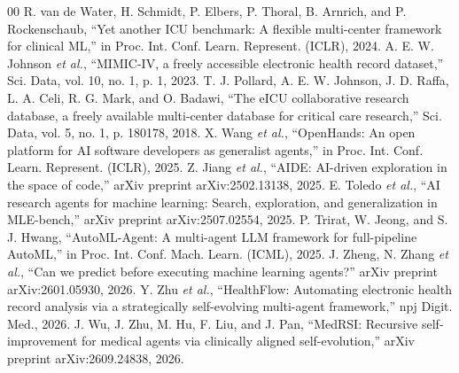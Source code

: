 \begin{thebibliography}{00}
 R. van de Water, H. Schmidt, P. Elbers, P. Thoral, B. Arnrich, and P. Rockenschaub, ``Yet another ICU benchmark: A flexible multi-center framework for clinical ML,'' in Proc. Int. Conf. Learn. Represent. (ICLR), 2024.
 A. E. W. Johnson \textit{et al.}, ``MIMIC-IV, a freely accessible electronic health record dataset,'' Sci. Data, vol. 10, no. 1, p. 1, 2023.
 T. J. Pollard, A. E. W. Johnson, J. D. Raffa, L. A. Celi, R. G. Mark, and O. Badawi, ``The eICU collaborative research database, a freely available multi-center database for critical care research,'' Sci. Data, vol. 5, no. 1, p. 180178, 2018.
 X. Wang \textit{et al.}, ``OpenHands: An open platform for AI software developers as generalist agents,'' in Proc. Int. Conf. Learn. Represent. (ICLR), 2025.
 Z. Jiang \textit{et al.}, ``AIDE: AI-driven exploration in the space of code,'' arXiv preprint arXiv:2502.13138, 2025.
 E. Toledo \textit{et al.}, ``AI research agents for machine learning: Search, exploration, and generalization in MLE-bench,'' arXiv preprint arXiv:2507.02554, 2025.
 P. Trirat, W. Jeong, and S. J. Hwang, ``AutoML-Agent: A multi-agent LLM framework for full-pipeline AutoML,'' in Proc. Int. Conf. Mach. Learn. (ICML), 2025.
 J. Zheng, N. Zhang \textit{et al.}, ``Can we predict before executing machine learning agents?'' arXiv preprint arXiv:2601.05930, 2026.
 Y. Zhu \textit{et al.}, ``HealthFlow: Automating electronic health record analysis via a strategically self-evolving multi-agent framework,'' npj Digit. Med., 2026.
 J. Wu, J. Zhu, M. Hu, F. Liu, and J. Pan, ``MedRSI: Recursive self-improvement for medical agents via clinically aligned self-evolution,'' arXiv preprint arXiv:2609.24838, 2026.
\end{thebibliography}